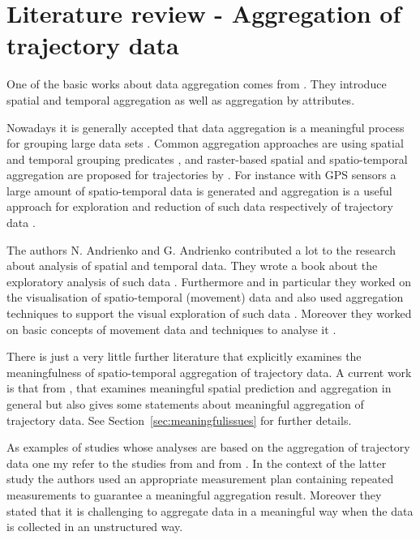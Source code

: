 \documentclass[12pt, oneside, a4paper]{scrbook}
\begin{document}
\section{Literature review - Aggregation of trajectory data}

One of the basic works about data aggregation comes from \citet{fredrikson_temporal_1999}. They introduce spatial and temporal aggregation as well as aggregation by attributes.
\par\medskip

Nowadays it is generally accepted that data aggregation is a meaningful process for grouping large data sets \citep{goldstein_using_1994}. 
Common aggregation approaches are using spatial and temporal grouping predicates \citep{fredrikson_temporal_1999}, and raster-based spatial and spatio-temporal aggregation are proposed for trajectories by \citet{meratnia_aggregation_2002}.
For instance with GPS sensors a large amount of spatio-temporal data is generated and aggregation is a useful approach for exploration and reduction of such data respectively of trajectory data \citep{andrienko_exploratory_2003, giannotti_trajectory_2007, andrienko_spatial_2011}.
\par\medskip

The authors N. Andrienko and G. Andrienko contributed a lot to the research about analysis of spatial and temporal data. They wrote a book about the exploratory analysis of such data \citep{andrienko2006exploratory}. 
Furthermore and in particular they worked on the visualisation of spatio-temporal (movement) data \citep{andrienko_exploratory_2003, andrienko2012visual} and also used aggregation techniques to support the visual exploration of such data \citep{andrienko2008spatio, andrienko2010general, andrienko_spatial_2011}. Moreover they worked on basic concepts of movement data and techniques to analyse it \citep{andrienko2008basic, andrienko2011conceptual}.
\par\medskip

There is just a very little further literature that explicitly examines the meaningfulness of spatio-temporal aggregation of trajectory data. A current work is that from \citet{stasch_meaningful_2014}, that examines meaningful spatial prediction and aggregation in general but also gives some statements about meaningful aggregation of trajectory data. See Section~\ref{sec:meaningfulissues} for further details.
\par\medskip

As examples of studies whose analyses are based on the aggregation of trajectory data one my refer to the studies from \citet{d2013participatory} and from \citet{elen2012aeroflex}. In the context of the latter study the authors used an appropriate measurement plan containing repeated measurements to guarantee a meaningful aggregation result. Moreover they stated that it is challenging to aggregate data in a meaningful way when the data is collected in an unstructured way.
\end{document}
